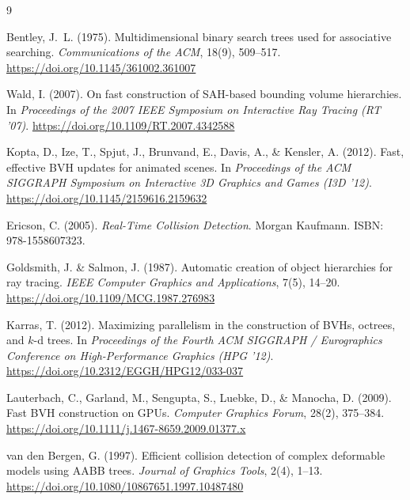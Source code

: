 \documentclass[12pt]{article}
\begin{document}
\begin{thebibliography}{9}

Bentley, J.~L. (1975).
\newblock Multidimensional binary search trees used for associative searching.
\newblock \textit{Communications of the ACM}, 18(9), 509--517.
\newblock \url{https://doi.org/10.1145/361002.361007}

Wald, I. (2007).
\newblock On fast construction of SAH-based bounding volume hierarchies.
\newblock In \textit{Proceedings of the 2007 IEEE Symposium on Interactive Ray
Tracing (RT '07)}.
\newblock \url{https://doi.org/10.1109/RT.2007.4342588}

Kopta, D., Ize, T., Spjut, J., Brunvand, E., Davis, A., \& Kensler, A. (2012).
\newblock Fast, effective BVH updates for animated scenes.
\newblock In \textit{Proceedings of the ACM SIGGRAPH Symposium on Interactive
3D Graphics and Games (I3D '12)}.
\newblock \url{https://doi.org/10.1145/2159616.2159632}

Ericson, C. (2005).
\newblock \textit{Real-Time Collision Detection}.
\newblock Morgan Kaufmann.
\newblock ISBN: 978-1558607323.

Goldsmith, J. \& Salmon, J. (1987).
\newblock Automatic creation of object hierarchies for ray tracing.
\newblock \textit{IEEE Computer Graphics and Applications}, 7(5), 14--20.
\newblock \url{https://doi.org/10.1109/MCG.1987.276983}

Karras, T. (2012).
\newblock Maximizing parallelism in the construction of BVHs, octrees, and $k$-d trees.
\newblock In \textit{Proceedings of the Fourth ACM SIGGRAPH / Eurographics Conference on High-Performance Graphics (HPG '12)}.
\newblock \url{https://doi.org/10.2312/EGGH/HPG12/033-037}

Lauterbach, C., Garland, M., Sengupta, S., Luebke, D., \& Manocha, D. (2009).
\newblock Fast BVH construction on GPUs.
\newblock \textit{Computer Graphics Forum}, 28(2), 375--384.
\newblock \url{https://doi.org/10.1111/j.1467-8659.2009.01377.x}

van den Bergen, G. (1997).
\newblock Efficient collision detection of complex deformable models using AABB trees.
\newblock \textit{Journal of Graphics Tools}, 2(4), 1--13.
\newblock \url{https://doi.org/10.1080/10867651.1997.10487480}

\end{thebibliography}
\end{document}
